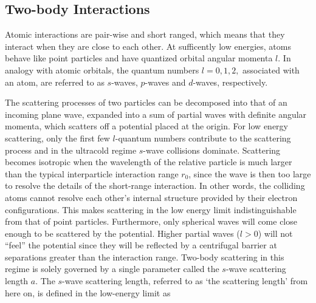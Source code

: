 \subsection{Two-body Interactions}
Atomic interactions are pair-wise and short ranged, which means that they interact when they are close to each other. At sufficently low energies, atoms behave like point particles and have quantized orbital angular momenta $l$. In analogy with atomic orbitals, the quantum numbers $l=0,1,2,$ associated with an atom, are referred to as $s$-waves, $p$-waves and $d$-waves, respectively. 

The scattering processes of two particles can be decomposed into that of an incoming plane wave, expanded into a sum of partial waves with definite angular momenta, which scatters off a potential placed at the origin. For low energy scattering, only the first few $l$-quantum numbers contribute to the scattering process and in the ultracold regime $s$-wave collisions dominate. Scattering becomes isotropic when the wavelength of the relative particle is much larger than the typical interparticle interaction range $r_0$, since the wave is then too large to resolve the details of the short-range interaction. In other words, the colliding atoms cannot resolve each other's internal structure provided by their electron configurations. This makes scattering in the low energy limit indistinguishable from that of point particles. Furthermore, only spherical waves will come close enough to be scattered by the potential. Higher partial waves ($l>0$) will not ``feel'' the potential since they will be reflected by a centrifugal barrier at separations greater than the interaction range. Two-body scattering in this regime is solely governed by a single parameter called the $s$-wave scattering length $a$. The $s$-wave scattering length, referred to as `the scattering length' from here on, is defined in the low-energy limit as

